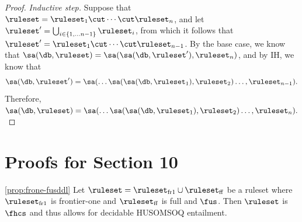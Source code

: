 \begin{proof}
\textit{Inductive step.} Suppose that $\ruleset = \ruleset_{1} \cut \cdots \cut \ruleset_{n}$, and let $\ruleset' = \bigcup_{i \in \{1, \ldots n-1\}} \ruleset_{i}$, from which it follows that $\ruleset' = \ruleset_{1} \cut \cdots \cut \ruleset_{n-1}$. By the base case, we know that $\sa(\db,\ruleset) = \sa(\sa(\db,\ruleset'),\ruleset_{n})$, and by IH, we know that $$\sa(\db,\ruleset') = \sa(\ldots\sa(\sa(\db,\ruleset_{1}),\ruleset_{2}) \ldots, \ruleset_{n-1}).$$Therefore, $\sa(\db,\ruleset) = \sa(\ldots\sa(\sa(\db,\ruleset_{1}),\ruleset_{2}) \ldots, \ruleset_{n}).$
\end{proof}

%

%




\section{Proofs for Section 10}\label{app:section-5-proofs}





\begin{customprop}{\ref{prop:frone-fusddl}}
Let $\ruleset = \ruleset_{\smash{\mathrm{fr1}}} \cup \ruleset_{\smash{\mathrm{ff}}}$ be a ruleset where $\ruleset_{\smash{\mathrm{fr1}}}$ is frontier-one and $\ruleset_{\smash{\mathrm{ff}}}$ is full and $\fus$. Then $\ruleset$ is $\fhcs$ and thus allows for decidable HUSOMSOQ entailment.  
\end{customprop}

